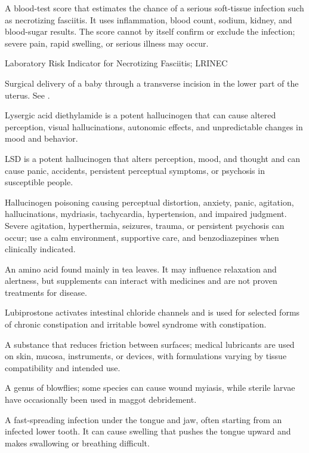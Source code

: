  A blood-test score that estimates the chance of a serious soft-tissue infection such as necrotizing fasciitis. It uses inflammation, blood count, sodium, kidney, and blood-sugar results. The score cannot by itself confirm or exclude the infection; severe pain, rapid swelling, or serious illness may occur.

\synonyms
Laboratory Risk Indicator for Necrotizing Fasciitis; LRINEC

 Surgical delivery of a baby through a transverse incision in the lower part of the uterus. See .

 Lysergic acid diethylamide is a potent hallucinogen that can cause altered perception, visual hallucinations, autonomic effects, and unpredictable changes in mood and behavior.

 LSD is a potent hallucinogen that alters perception, mood, and thought and can cause panic, accidents, persistent perceptual symptoms, or psychosis in susceptible people.

 Hallucinogen poisoning causing perceptual distortion, anxiety, panic, agitation, hallucinations, mydriasis, tachycardia, hypertension, and impaired judgment. Severe agitation, hyperthermia, seizures, trauma, or persistent psychosis can occur; use a calm environment, supportive care, and benzodiazepines when clinically indicated.

 An amino acid found mainly in tea leaves. It may influence relaxation and alertness, but supplements can interact with medicines and are not proven treatments for disease.

 Lubiprostone activates intestinal chloride channels and is used for selected forms of chronic constipation and irritable bowel syndrome with constipation.

 A substance that reduces friction between surfaces; medical lubricants are used on skin, mucosa, instruments, or devices, with formulations varying by tissue compatibility and intended use.

 A genus of blowflies; some species can cause wound myiasis, while sterile larvae have occasionally been used in maggot debridement.

 A fast-spreading infection under the tongue and jaw, often starting from an infected lower tooth. It can cause swelling that pushes the tongue upward and makes swallowing or breathing difficult.

